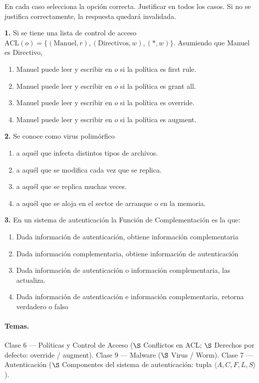 \begin{consigna}
En cada caso selecciona la opción correcta. Justificar en todos los casos. Si no se justifica
correctamente, la respuesta quedará invalidada.

\textbf{1.} Si se tiene una lista de control de acceso $\mathrm{ACL}(o) = \{(\text{Manuel}, r),
(\text{Directivos}, w), (*,w)\}$. Asumiendo que Manuel es Directivo,
\begin{enumerate}[label=\alph*.]
  \item Manuel puede leer y escribir en $o$ si la política es first rule.
  \item Manuel puede leer y escribir en $o$ si la política es grant all.
  \item Manuel puede leer y escribir en $o$ si la política es override.
  \item Manuel puede leer y escribir en $o$ si la política es augment.
\end{enumerate}

\textbf{2.} Se conoce como virus polimórfico
\begin{enumerate}[label=\alph*.]
  \item a aquél que infecta distintos tipos de archivos.
  \item a aquél que se modifica cada vez que se replica.
  \item a aquél que se replica muchas veces.
  \item a aquél que se aloja en el sector de arranque o en la memoria.
\end{enumerate}

\textbf{3.} En un sistema de autenticación la Función de Complementación es la que:
\begin{enumerate}[label=\alph*.]
  \item Dada información de autenticación, obtiene información complementaria
  \item Dada información complementaria, obtiene información de autenticación
  \item Dada información de autenticación o información complementaria, las actualiza.
  \item Dada información de autenticación e información complementaria, retorna verdadero o falso
\end{enumerate}
\end{consigna}

\paragraph{Temas.}
Clase 6 --- Políticas y Control de Acceso ($\S$ Conflictos en ACL; $\S$ Derechos por defecto:
override / augment). Clase 9 --- Malware ($\S$ Virus / Worm). Clase 7 --- Autenticación
($\S$ Componentes del sistema de autenticación: tupla $\langle A,C,F,L,S\rangle$).

